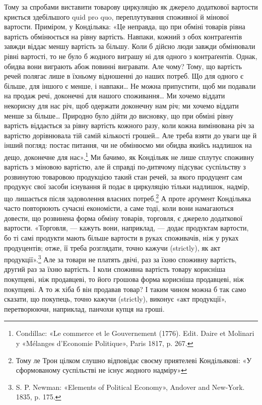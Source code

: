 Тому за спробами виставити товарову циркуляцію як джерело
додаткової вартости криється здебільшого quid pro quo, переплутування
споживної й мінової вартости. Приміром, у Кондільяка:
«Це неправда, що при обміні товарів рівна вартість обмінюється
на рівну вартість. Навпаки, кожний з обох контраґентів завжди
віддає меншу вартість за більшу. Коли б дійсно люди завжди
обмінювали рівні вартості, то не було б жодного виграшу ні для
одного з контраґентів. Однак, обидва вони виграють абож повинні
вигравати. Але чому? Тому, що вартість речей полягає
лише в їхньому відношенні до наших потреб. Що для одного є
більше, для іншого є менше, і навпаки\dots{} Не можна припустити,
щоб ми подавали на продаж речі, доконечні для нашого споживання\dots{}
Ми хочемо віддати некорисну для нас річ, щоб одержати
доконечну нам річ; ми хочемо віддати менше за більше\dots{} Природно
було дійти до висновку, що при обміні рівну вартість віддається
за рівну вартість кожного разу, коли кожна вимінювана
річ за вартістю дорівнювала тій самій кількості грошей\dots{} Але
треба взяти до уваги ще й інший погляд: постає питання, чи не
обмінюємо ми обидва якийсь надлишок на дещо, доконечне для
нас».\footnote{
Condillac: «Le commerce et le Gouvernement (1776). Edit. Daire
et Molinari y «Mélanges d’Economie Politique», Paris 1817, p. 267.
} Ми бачимо, як Кондільяк не лише сплутує споживну
вартість з міновою вартістю, але й справді по-дитячому підсуває
суспільству з розвинутою товаровою продукцією такий стан речей,
за якого продуцент сам продукує свої засоби існування й подає
в циркуляцію тільки надлишок, надмір, що лишається після
задоволення власних потреб.\footnote{
Тому ле Трон цілком слушно відповідає своєму приятелеві Кондільякові:
«У сформованому суспільстві не існує жодного надміру»
} А проте арґумент Кондільяка
часто повторюють сучасні економісти, а саме тоді, коли вони
намагаються довести, що розвинена форма обміну товарів, торговля,
є джерело додаткової вартости. «Торговля, — кажуть вони,
наприклад, — додає продуктам вартости, бо ті самі продукти
мають більше вартости в руках споживачів, ніж у руках продуцентів;
отже, її треба розглядати, точно кажучи (strictly), як
акт продукції».\footnote{
S. P. Newman: «Elements of Political Economy», Andover and
New-York. 1835, p. 175.
} Але за товари не платять двічі, раз за їхню
споживну вартість, другий раз за їхню вартість. І коли споживна
вартість товару корисніша покупцеві, ніж продавцеві, то його
грошова форма корисніша продавцеві, ніж покупцеві. А то ж
хіба б він продавав товар? І таким чином можна б так само сказати,
що покупець, точно кажучи (strictly), виконує «акт продукції»,
перетворюючи, наприклад, панчохи купця на гроші.

